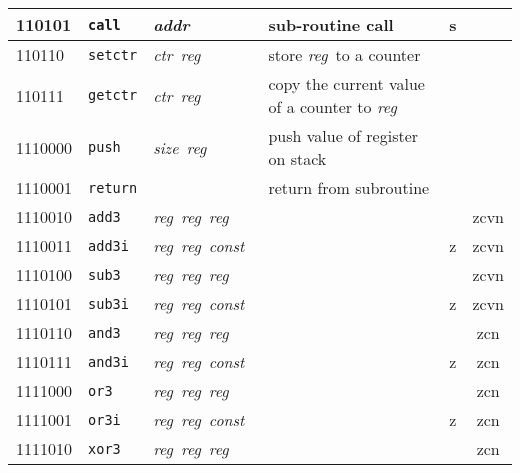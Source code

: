 \documentclass[architecture]{compas2018}
\newcommand{\reg}{\textit{reg}}
\newcommand{\const}{\textit{const}}
\newcommand{\ctr}{\textit{ctr}}
\newcommand{\size}{\textit{size}}
\newcommand{\addr}{\textit{addr}}
\begin{document}
\begin{table}[!h]
\begin{center}
\begin{tabular}{|l|l|l|l|l|c|}
    \hline
    110101  & \texttt{call}   & \addr\                        & sub-routine call                                     & s    &             \\
    \hline
    110110  & \texttt{setctr} & \ctr\ \reg\                   & store \reg\ to a counter                             &      &             \\
    \hline
    110111  & \texttt{getctr} & \ctr\ \reg\                   & copy the current value of a counter to \reg\         &      &             \\
    \hline
    1110000 & \texttt{push}   & \size\ \reg\                  & push value of register on stack                      &      &             \\
    \hline
    1110001 & \texttt{return} &                               & return from subroutine                               &      &             \\
    \hline
    1110010 & \texttt{add3}   & \reg\ \reg\ \reg\             &                                                      &      & zcvn        \\
    \hline
    1110011 & \texttt{add3i}  & \reg\ \reg\ \const\           &                                                      & z    & zcvn        \\
    \hline
    1110100 & \texttt{sub3}   & \reg\ \reg\ \reg\             &                                                      &      & zcvn        \\
    \hline
    1110101 & \texttt{sub3i}  & \reg\ \reg\ \const\           &                                                      & z    & zcvn        \\
    \hline
    1110110 & \texttt{and3}   & \reg\  \reg\ \reg\            &                                                      &      & zcn         \\
    \hline
    1110111 & \texttt{and3i}  & \reg\ \reg\ \const\           &                                                      & {z}  & zcn         \\
    \hline
    1111000 & \texttt{or3}    & \reg\ \reg\ \reg\             &                                                      &      & zcn         \\
    \hline
    1111001 & \texttt{or3i}   & \reg\ \reg\ \const\           &                                                      & {z}  & zcn         \\
    \hline
    1111010 & \texttt{xor3}   & \reg\ \reg\ \reg\             &                                                      &      & zcn         \\

\end{tabular}
\end{center}
\end{table}
\end{document}
